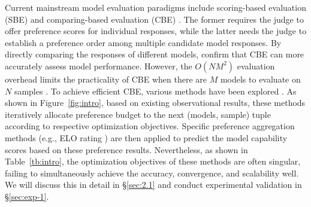 Current mainstream model evaluation paradigms include scoring-based evaluation (SBE) \citep{geval,pointwise} and comparing-based evaluation (CBE) \citep{arena,alpacaeval}. The former requires the judge to offer preference scores for individual responses, while the latter needs the judge to establish a preference order among multiple candidate model responses. 
By directly comparing the responses of different models, \citet{judging,role} confirm that CBE can more accurately assess model performance.
However, the $O(NM^2)$ evaluation overhead limits the practicality of CBE when there are $M$ models to evaluate on $N$ samples \citep{allpair}. 
To achieve efficient CBE, various methods have been explored \cite{arena,speeding,alpacaeval}. 
As shown in Figure~\ref{fig:intro}, based on existing observational results, these methods iteratively allocate preference budget to the next (models, sample) tuple according to respective optimization objectives. 
Specific preference aggregation methods (e.g., ELO rating \citep{elo}) are then applied to predict the model capability scores based on these preference results. 
Nevertheless, as shown in Table~\ref{tb:intro}, the optimization objectives of these methods are often singular, failing to simultaneously achieve the accuracy, convergence, and scalability well. We will discuss this in detail in \S\ref{sec:2.1} and conduct experimental validation in \S\ref{sec:exp-1}.


